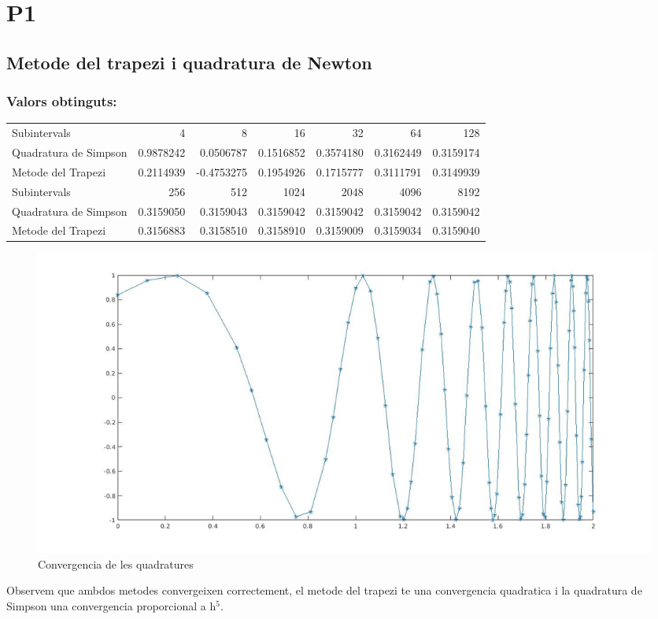 \documentclass[11pt]{article}
\author{Dean}
\date{\today}
\title{}
\begin{document}
\section{P1}
\label{sec:orgb29a10e}
\subsection{Metode del trapezi i quadratura de Newton}
\label{sec:org9bb5414}
\subsubsection{Valors obtinguts:}
\label{sec:org37bfd66}
\begin{center}
\begin{tabular}{lrrrrrr}
Subintervals & 4 & 8 & 16 & 32 & 64 & 128\\
Quadratura de Simpson & 0.9878242 & 0.0506787 & 0.1516852 & 0.3574180 & 0.3162449 & 0.3159174\\
Metode del Trapezi & 0.2114939 & -0.4753275 & 0.1954926 & 0.1715777 & 0.3111791 & 0.3149939\\
Subintervals & 256 & 512 & 1024 & 2048 & 4096 & 8192\\
Quadratura de Simpson & 0.3159050 & 0.3159043 & 0.3159042 & 0.3159042 & 0.3159042 & 0.3159042\\
Metode del Trapezi & 0.3156883 & 0.3158510 & 0.3158910 & 0.3159009 & 0.3159034 & 0.3159040\\
\end{tabular}
\end{center}

\begin{figure}[htbp]
\centering
\includegraphics[width=.9\linewidth]{./TrapezivsSimpson.jpg}
\caption{\label{fig:org74d4e06}
Convergencia de les quadratures}
\end{figure}

Observem que ambdos metodes convergeixen correctement, el metode del trapezi te una convergencia quadratica i la quadratura de Simpson una convergencia proporcional a h\(^{\text{5}}\).
\end{document}
